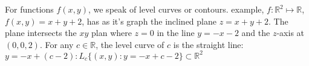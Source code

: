 \documentclass{article}
\newcommand{\R}{\mathbb{R}}
\begin{document}
For functions $f(x, y)$, we speak of level curves or contours. example, $f: \R^2 \mapsto \R$, $f(x, y) = x + y + 2$, has as it's graph the inclined plane $z = x + y + 2$. The plane intersects the $xy$ plan where $z = 0$ in the line $y = -x - 2$ and the $z$-axis at $(0, 0, 2)$. For any $c \in \R$, the level curve of $c$ is the straight line: $y = -x + (c-2): L_c \{(x, y): y = - x + c - 2 \}\subset \R^2$
\end{document}
